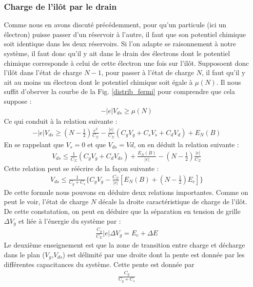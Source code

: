 \subsubsection{Charge de l'il\^ot par le drain}
Comme nous en avons discuté précédemment, pour qu'un particule (ici un électron) puisse passer d'un réservoir à l'autre, il faut que son potentiel chimique soit identique dans les deux réservoirs. Si l'on adapte se raisonnement à notre système, il faut donc qu'il y ait dans le drain des électrons dont le potentiel chimique corresponde à celui de cette électron une fois sur l'il\^ot. Supposoent donc l'il\^ot dans l'état de charge $N-1$, pour passer à l'état de charge $N$, il faut qu'il y ait au moins un électron dont le potentiel chimique soit égale à $\mu(N)$. Il nous suffit d'oberver la courbe de la Fig. \ref{distrib_fermi} pour comprendre que cela suppose :
\begin{eqnarray}
-|e|V_{ds} \geq \mu(N)
\end{eqnarray}
Ce qui conduit à la relation suivante :
\begin{eqnarray}
-|e|V_{ds} \geq (N-\frac{1}{2})\frac{e^2}{C_{\Sigma}}
-
\frac{|e|}{C_{\Sigma}}(C_gV_g + C_sV_s + C_dV_d)
+
E_N(B) \nonumber
\end{eqnarray}
En se rappelant que $V_s= 0$ et que $V_{ds} = Vd$, on en déduit la relation suivante :
\begin{eqnarray}
V_{ds} \leq \frac{1}{C_{\Sigma}}(C_gV_g + C_dV_{ds}) + \frac{E_N(B)}{|e|} - (N-\frac{1}{2})\frac{|e|}{C_{\Sigma}} \nonumber
\end{eqnarray}
Cette relation peut se réécrire de la façon suivante :
\begin{eqnarray}
V_{ds} \leq \frac{1}{C_g + C_s} \{C_gV_g - \frac{C_{\Sigma}}{|e|}[E_N(B) + (N-\frac{1}{2})E_c] \}
\end{eqnarray}
De cette formule nous pouvons en déduire deux relations importantes. Comme on peut le voir, l'état de charge $N$ décale la droite caractéristique de charge de l'il\^ot. De cette constatation, on peut en déduire que la séparation en tension de grille $\Delta V_g$ et liée à l'énergie du système par :
\begin{eqnarray}
\frac{C_g}{C_{\Sigma}} |e| \Delta V_g = E_c + \Delta E
\end{eqnarray}
Le deuxième enseignement est que la zone de transition entre charge et décharge dans le plan ($V_g$,$V_{ds}$) est délimité par une droite dont la pente est donnée par les différentes capacitances du système. Cette pente est donnée par 
\begin{eqnarray}
\frac{C_g}{C_g + C_s}
\end{eqnarray}



